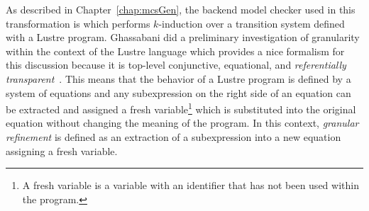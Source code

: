 As described in Chapter~\ref{chap:mcsGen}, the backend model checker used in this transformation is \jkind which performs $k$-induction over a transition system defined with a Lustre program. Ghassabani did a preliminary investigation of granularity within the context of the Lustre language which provides a nice formalism for this discussion because it is top-level conjunctive, equational, and \textit{referentially transparent}~\cite{Halbwachs91:IEEE}. This means that the behavior of a Lustre program is defined by a system of equations and any subexpression on the right side of an equation can be extracted and assigned a fresh variable\footnote{A fresh variable is a variable with an identifier that has not been used within the program.} which is substituted into the original equation without changing the meaning of the program. In this context, \textit{granular refinement} is defined as an extraction of a subexpression into a new equation assigning a fresh variable. 



